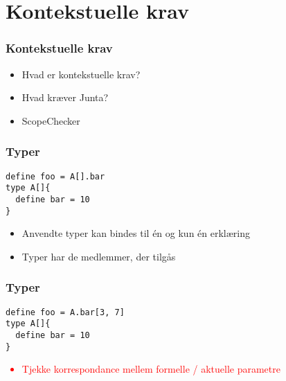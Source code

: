 \section{Kontekstuelle krav}

\begin{frame}
\frametitle{Kontekstuelle krav}
\begin{center}
\begin{itemize}
\item Hvad er kontekstuelle krav?
\item Hvad kræver Junta?
\item ScopeChecker
\end{itemize}
\end{center}
\end{frame}


\begin{frame}[fragile]
\frametitle{Typer}
\begin{lstlisting}
define foo = A[].bar
type A[]{
  define bar = 10
}
\end{lstlisting}
\begin{center}
\begin{itemize}                                  
\item Anvendte typer kan bindes til én og kun én erklæring
\item Typer har de medlemmer, der tilgås
\end{itemize}
\end{center}
\end{frame}

\begin{frame}[fragile]

\end{frame}

\begin{frame}[fragile]
\frametitle{Typer}
\begin{lstlisting}
define foo = A.bar[3, 7]
type A[]{
  define bar = 10
}
\end{lstlisting}
\begin{center}
\textcolor{red}{
\begin{itemize}                                  
\item Tjekke korrespondance mellem formelle / aktuelle parametre
\end{itemize}
}
\end{center}
\end{frame}

